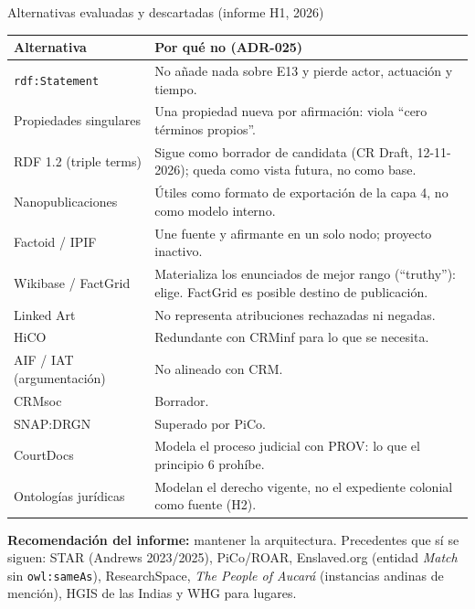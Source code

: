 \documentclass[aspectratio=169,10pt]{beamer}
\newcommand{\ttt}[1]{\texttt{\small #1}}
\begin{document}
\begin{frame}[shrink=6]{Alternativas evaluadas y descartadas (informe H1, 2026)}
\scriptsize
\begin{tabular}{@{}p{3.4cm}p{9.8cm}@{}}
\toprule
Alternativa & Por qué no (ADR-025) \\
\midrule
\ttt{rdf:Statement} & No añade nada sobre E13 y pierde actor, actuación y tiempo. \\
Propiedades singulares & Una propiedad nueva por afirmación: viola \enquote{cero términos propios}. \\
RDF 1.2 (triple terms) & Sigue como borrador de candidata (CR Draft, 12-11-2026); queda como vista futura, no como base. \\
Nanopublicaciones & Útiles como \alert{formato de exportación} de la capa 4, no como modelo interno. \\
Factoid / IPIF & Une fuente y afirmante en un solo nodo; proyecto inactivo. \\
Wikibase / FactGrid & Materializa los enunciados de mejor rango (\enquote{truthy}): elige. FactGrid es posible destino de publicación. \\
Linked Art & No representa atribuciones rechazadas ni negadas. \\
HiCO & Redundante con CRMinf para lo que se necesita. \\
AIF / IAT (argumentación) & No alineado con CRM. \\
CRMsoc & Borrador. \\
SNAP:DRGN & Superado por PiCo. \\
CourtDocs & Modela el proceso judicial con PROV: lo que el principio 6 prohíbe. \\
Ontologías jurídicas & Modelan el derecho vigente, no el expediente colonial como fuente (H2). \\
\bottomrule
\end{tabular}

\medskip
\small \textbf{Recomendación del informe:} mantener la arquitectura. Precedentes que sí se siguen: STAR (Andrews
2023/2025), PiCo/ROAR, Enslaved.org (entidad \emph{Match} sin \ttt{owl:sameAs}), ResearchSpace, \emph{The People of
Aucará} (instancias andinas de mención), HGIS de las Indias y WHG para lugares.
\end{frame}
\end{document}
